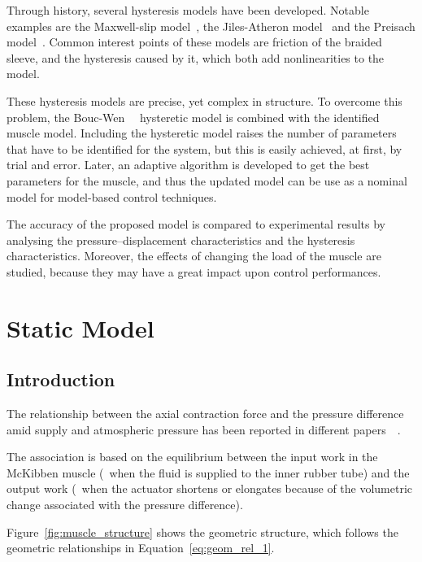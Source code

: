 Through history, several hysteresis models have been developed.
Notable examples are the Maxwell-slip model~\cite{al2005generalized},
the Jiles-Atheron model~\cite{lederer1999parameter}
and the Preisach model~\cite{ge1997generalized}. 
Common interest points of these models are friction of the braided sleeve,
and the hysteresis caused by it, which both add nonlinearities to the model.

These hysteresis models are precise, yet complex in structure.
To overcome this problem, the Bouc-Wen~\cite{bouc}~\cite{bouc_wen} hysteretic model is combined with 
the identified muscle model. Including the hysteretic model raises the number
of parameters that have to be identified for the system, but this is easily
achieved, at first, by trial and error. Later, an adaptive algorithm is developed
to get the best parameters for the muscle, and thus the updated model can be use
as a nominal model for model-based control techniques.

The accuracy of the proposed model is compared to experimental results
by analysing the pressure--displacement characteristics and the hysteresis characteristics.
Moreover, the effects of changing the load of the muscle are studied,
because they may have a great impact upon control performances.

\section{Static Model}


\subsection{Introduction}
The relationship between the axial contraction force and the pressure difference
amid supply and atmospheric pressure has been reported in different papers~\cite{chou1994static}~\cite{schulte}.

The association is based on the equilibrium between the input work in the McKibben muscle
(\ie~when the fluid is supplied to the inner rubber tube)
and the output work (\ie~when the actuator shortens or elongates
because of the volumetric change associated with the pressure difference).

Figure~\ref{fig:muscle_structure} shows the geometric structure,
which follows the geometric relationships in Equation~\ref{eq:geom_rel_1}.


